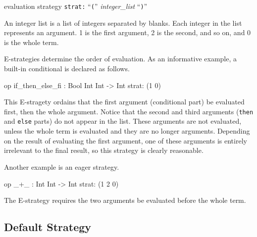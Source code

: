 \documentclass[a4paper]{memoir}
\begin{document}
\begin{bsyntax} evaluation strategy  \Hline
\texttt{strat:} ``\texttt{(}'' \textit{integer\_list} ``\texttt{)}''
\end{bsyntax}

An integer list is a list of integers separated by blanks.
Each integer in the list represents an argument. 1 is
the first argument, 2 is the second, and so on, and 0 is
the whole term.

E-strategies determine the order of evaluation.
As an informative example, a built-in conditional is
declared as follows.
\begin{vvtm}
\begin{ccode}
  op if_then_else_fi : Bool Int Int -> Int { strat: (1 0) }
\end{ccode}
\end{vvtm}
This E-stragety ordains that the first argument (conditional part) be
evaluated first, then the whole argument. Notice that the second
and third arguments (\verb|then| and \verb|else| parts) do not appear in
the list. These arguments are not evaluated, unless the whole term is
evaluated and they are no longer arguments. Depending on the result of
evaluating the first argument, one of these arguments is entirely
irrelevant to the final result, so this strategy is clearly reasonable.

Another example is an eager strategy.
\begin{vvtm}
\begin{ccode}
  op _+_ : Int Int -> Int { strat: (1 2 0) }
\end{ccode}
\end{vvtm}
The E-strategy requires the two arguments be evaluated before the whole
term.

\subsection{Default Strategy}
\end{document}

